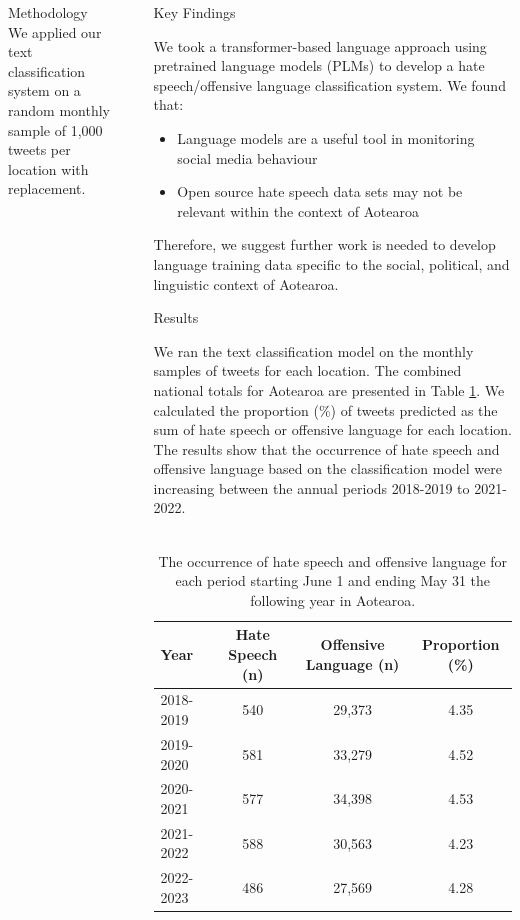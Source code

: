 \documentclass[final]{beamer}
\newlength{\sepwidth}
\newlength{\largecolwidth}
\newlength{\smallcolwidth}
\newcommand{\separatorcolumn}{\begin{column}{\sepwidth}\end{column}}
\begin{document}
\begin{frame}[t]
\begin{columns}[t]
\begin{column}{\smallcolwidth}
\begin{block}{Methodology}
    We applied our text classification system on a random monthly sample of 1,000 tweets per location with replacement.
    \end{block}

\end{column}

\separatorcolumn

\begin{column}{\largecolwidth}

  \begin{exampleblock}{Key Findings}

    We took a transformer-based language approach using pretrained language models (PLMs) to develop a hate speech/offensive language classification system. We found that:

    \begin{itemize}
        \item Language models are a useful tool in monitoring social media behaviour
        \item Open source hate speech data sets may not be relevant within the context of Aotearoa
    \end{itemize}

    Therefore, we suggest further work is needed to develop language training data specific to the social, political, and linguistic context of Aotearoa.
  
  \end{exampleblock} 
  
  \begin{block}{Results}

  We ran the text classification model on the monthly samples of tweets for each location. The combined national totals for Aotearoa are presented in Table \ref{tab:1}. We calculated the proportion (\%) of tweets predicted as the sum of hate speech or offensive language for each location. The results show that the occurrence of hate speech and offensive language based on the classification model were increasing between the annual periods 2018-2019 to 2021-2022.
  \\~\
  
    \begin{table}
    \small
    \centering
    \begin{tabular}{lccc}
    \hline
    \textbf{Year} & \textbf{Hate Speech (n)} & \textbf{Offensive Language (n)} & \textbf{Proportion (\%)} \\
    \hline
    2018-2019 & 540 & 29,373 & 4.35\\
    2019-2020 & 581 & 33,279 & 4.52\\
    2020-2021 & 577 & 34,398 & 4.53\\
    2021-2022 & 588 & 30,563 & 4.23\\
    2022-2023 & 486 & 27,569 & 4.28\\
    \hline
    \end{tabular}
    \caption{\label{tab:1} The occurrence of hate speech and offensive language for each period starting June 1 and ending May 31 the following year in Aotearoa.}
    \end{table}


\end{block}
\end{column}
\end{columns}
\end{frame}
\end{document}
